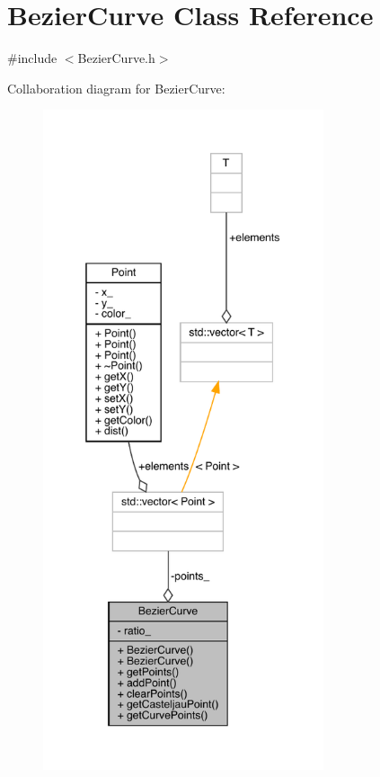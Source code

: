 \hypertarget{class_bezier_curve}{}\section{Bezier\+Curve Class Reference}
\label{class_bezier_curve}


{\ttfamily \#include $<$Bezier\+Curve.\+h$>$}



Collaboration diagram for Bezier\+Curve\+:\nopagebreak
\begin{figure}[H]
\begin{center}
\leavevmode
\includegraphics[height=550pt]{class_bezier_curve__coll__graph}
\end{center}
\end{figure}
